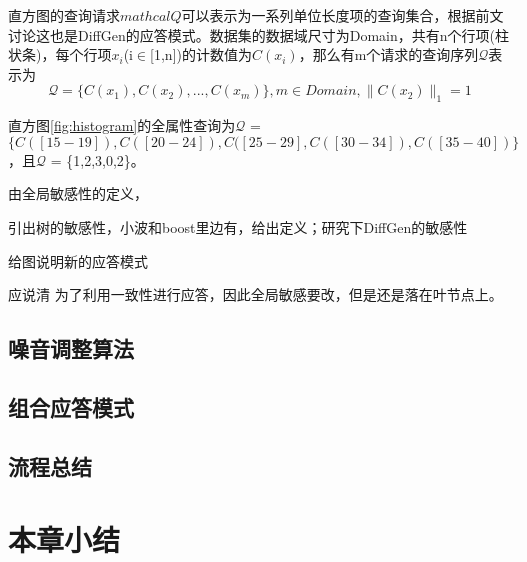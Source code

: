 直方图的查询请求$mathcal{Q}$可以表示为一系列单位长度项的查询集合，根据前文讨论这也是DiffGen的应答模式。数据集的数据域尺寸为Domain，共有n个行项(柱状条)，每个行项$x_{i}$(i$\in$[1,n])的计数值为$C(x_{i})$，那么有m个请求的查询序列$\mathcal{Q}$表示为
\[
	\mathcal{Q} = \{C(x_{1}),C(x_{2}),...,C(x_{m})\},m \in Domain,\|C(x_{2})\|_{1} = 1
\]

\begin{exmp}
	\label{chap4_exmp}
	直方图\ref{fig:histogram}的全属性查询为$\mathcal{Q}$ = $\{C([15-19]),C([20-24]),C([25-29],C([30-34]),C([35-40])\}$，且$\mathcal{Q}$ = \{1,2,3,0,2\}。
\end{exmp}

由全局敏感性的定义，

引出树的敏感性，小波和boost里边有，给出定义；研究下DiffGen的敏感性

给图说明新的应答模式

应说清 为了利用一致性进行应答，因此全局敏感要改，但是还是落在叶节点上。

\subsection{噪音调整算法}

\subsection{组合应答模式}

\subsection{流程总结}

\section{本章小结}